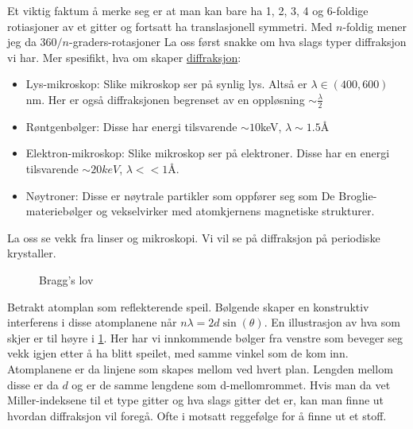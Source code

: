 \documentclass{article}
\begin{document}
Et viktig faktum å merke seg er at man kan bare ha 1, 2, 3, 4 og 6-foldige rotiasjoner av et gitter og fortsatt ha translasjonell symmetri. Med $n$-foldig mener jeg da  $360 / n$-graders-rotasjoner
\nyside
{}
La oss først snakke om  hva slags typer diffraksjon vi har. Mer spesifikt, hva om skaper \underline{diffraksjon}:
\begin{itemize}
    \item Lys-mikroskop: Slike mikroskop ser på synlig lys. Altså er $\lambda \in (400, 600)$ nm. Her er også diffraksjonen begrenset av en oppløsning $\sim \frac{\lambda}{2}$
    \item Røntgenbølger: Disse har energi tilsvarende $\sim 10 $keV, $\lambda \sim 1.5$Å
    \item Elektron-mikroskop: Slike mikroskop ser på elektroner. Disse har en energi tilsvarende $\sim 20 keV$, $\lambda << 1$Å.
    \item Nøytroner: Disse er nøytrale partikler som oppfører seg som De Broglie-materiebølger og vekselvirker med atomkjernens magnetiske strukturer.
\end{itemize}
La oss se vekk fra linser og mikroskopi. Vi vil se på diffraksjon på periodiske krystaller.
\begin{figure}
    \centering
    \caption{Bragg's lov}
    \label{fig:braggs_lov}
\end{figure}
Betrakt atomplan som reflekterende speil. Bølgende skaper en konstruktiv interferens i disse atomplanene når $n \lambda = 2d \sin(\theta)$. En illustrasjon av hva som skjer er til høyre i \ref{fig:braggs_lov}. Her har vi innkommende bølger fra venstre som beveger seg vekk igjen etter å ha blitt speilet, med samme vinkel som de kom inn. Atomplanene er da linjene som skapes mellom ved hvert plan. Lengden mellom disse er da $d$ og er de samme lengdene som d-mellomrommet. Hvis man da vet Miller-indeksene til et type gitter og hva slags gitter det er, kan man finne ut hvordan diffraksjon vil foregå. Ofte i motsatt reggefølge for å finne ut et stoff.
\end{document}
